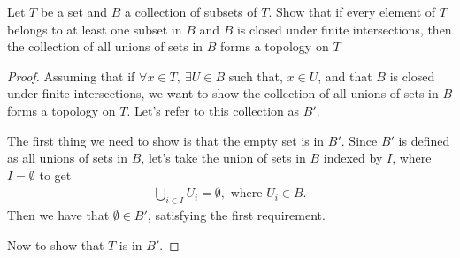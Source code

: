\documentclass[12pt]{article}
\begin{document}
Let $T$ be a set and $B$ a collection of subsets of $T$. Show that if every element of $T$ belongs to at least one subset in $B$ and $B$ is closed under finite intersections, then the collection of all unions of sets in $B$ forms a topology on $T$
\begin{proof}
    Assuming that if $\forall x \in T,\ \exists U \in B$ such that, $x \in U$, and that $B$ is closed under finite intersections, we want to show the collection of all unions of sets in $B$ forms a topology on $T$. Let's refer to this collection as $B'$.
    
    The first thing we need to show is that the empty set is in $B'$. Since $B'$ is defined as all unions of sets in $B$, let's take the union of sets in $B$ indexed by $I$, where $I = \emptyset$ to get
    \begin{align*}
        \bigcup_{i\in I}U_i = \emptyset, \text{ where $U_i \in B$}.
    \end{align*}
    Then we have that $\emptyset \in B'$, satisfying the first requirement. 

    Now to show that $T$ is in $B'$. 
\end{proof}
\end{document}
